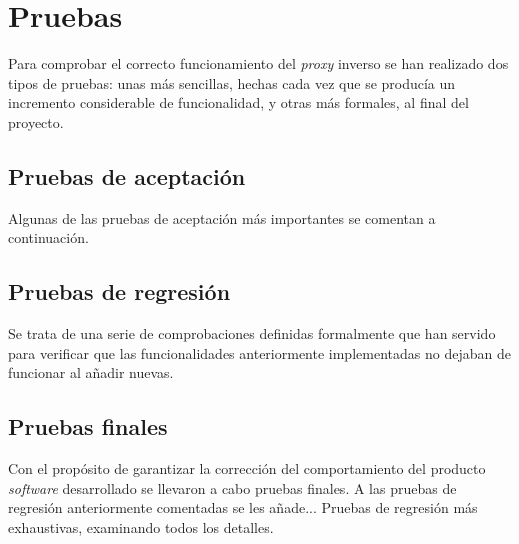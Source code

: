 \documentclass[11pt,spanish,listoffigures]{tfgetsinf}
\begin{document}


	\section{Pruebas}

Para comprobar el correcto funcionamiento del \emph{proxy} inverso se han realizado dos tipos de pruebas: unas más sencillas, hechas cada vez que se producía un incremento considerable de funcionalidad, y otras más formales, al final del proyecto.


		\subsection{Pruebas de aceptación} \label{pruebasDeAceptacion}
		
Algunas de las pruebas de aceptación más importantes se comentan a continuación.


		\subsection{Pruebas de regresión}

Se trata de una serie de comprobaciones definidas formalmente que han servido para verificar que las funcionalidades anteriormente implementadas no dejaban de funcionar al añadir nuevas.


		\subsection{Pruebas finales}

Con el propósito de garantizar la corrección del comportamiento del producto \emph{software} desarrollado se llevaron a cabo pruebas finales. A las pruebas de regresión anteriormente comentadas se les añade... Pruebas de regresión más exhaustivas, examinando todos los detalles.

\end{document}
